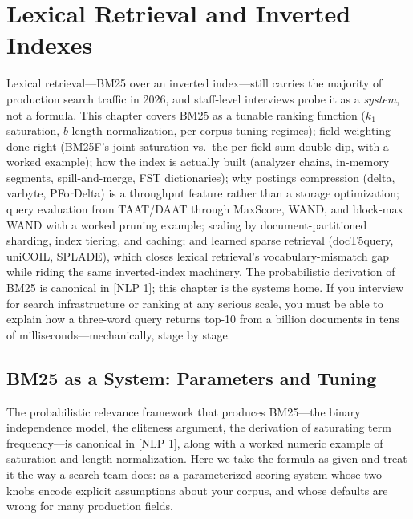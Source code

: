\chapter{Lexical Retrieval and Inverted Indexes}
\label{sr:chap:lexical_retrieval_inverted_indexes}

\begin{tldr}
Lexical retrieval---BM25 over an inverted index---still carries the majority of production search traffic in 2026, and staff-level interviews probe it as a \emph{system}, not a formula. This chapter covers BM25 as a tunable ranking function ($k_1$ saturation, $b$ length normalization, per-corpus tuning regimes); field weighting done right (BM25F's joint saturation vs.\ the per-field-sum double-dip, with a worked example); how the index is actually built (analyzer chains, in-memory segments, spill-and-merge, FST dictionaries); why postings compression (delta, varbyte, PForDelta) is a throughput feature rather than a storage optimization; query evaluation from TAAT/DAAT through MaxScore, WAND, and block-max WAND with a worked pruning example; scaling by document-partitioned sharding, index tiering, and caching; and learned sparse retrieval (docT5query, uniCOIL, SPLADE), which closes lexical retrieval's vocabulary-mismatch gap while riding the same inverted-index machinery. The probabilistic derivation of BM25 is canonical in [NLP 1]; this chapter is the systems home. If you interview for search infrastructure or ranking at any serious scale, you must be able to explain how a three-word query returns top-10 from a billion documents in tens of milliseconds---mechanically, stage by stage.
\end{tldr}

\section{BM25 as a System: Parameters and Tuning}
\label{sr:sec:bm25_system}

The probabilistic relevance framework that produces BM25---the binary independence model, the eliteness argument, the derivation of saturating term frequency---is canonical in [NLP 1], along with a worked numeric example of saturation and length normalization. Here we take the formula as given and treat it the way a search team does: as a parameterized scoring system whose two knobs encode explicit assumptions about your corpus, and whose defaults are wrong for many production fields.

